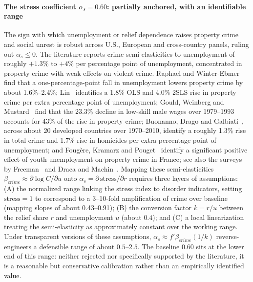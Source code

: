 \documentclass[review,12pt]{elsarticle}
\theoremstyle{plain}
\theoremstyle{definition}
\theoremstyle{remark}
\begin{document}
\paragraph{The stress coefficient $\alpha_s=0.60$: partially anchored, with an identifiable range} The sign with which unemployment or relief dependence raises property crime and social unrest is robust across U.S., European and cross-country panels, ruling out $\alpha_s\leq 0$. The literature reports crime semi-elasticities to unemployment of roughly $+1.3\%$ to $+4\%$ per percentage point of unemployment, concentrated in property crime with weak effects on violent crime. Raphael and Winter-Ebmer~\cite{RWE2001} find that a one-percentage-point fall in unemployment lowers property crime by about 1.6\%--2.4\%; Lin~\cite{Lin2008} identifies a 1.8\% OLS and 4.0\% 2SLS rise in property crime per extra percentage point of unemployment; Gould, Weinberg and Mustard~\cite{GWM2002} find that the 23.3\% decline in low-skill male wages over 1979--1993 accounts for 43\% of the rise in property crime; Buonanno, Drago and Galbiati~\cite{BDG2014}, across about 20 developed countries over 1970--2010, identify a roughly 1.3\% rise in total crime and 1.7\% rise in homicides per extra percentage point of unemployment; and Foug\`ere, Kramarz and Pouget~\cite{FKP2009} identify a significant positive effect of youth unemployment on property crime in France; see also the surveys by Freeman~\cite{Freeman1999} and Draca and Machin~\cite{DM2015}. Mapping these semi-elasticities $\beta_{crime}\approx\partial\log C/\partial u$ onto $\alpha_s=\partial\,\text{stress}/\partial r$ requires three layers of assumptions: (A) the normalized range linking the stress index to disorder indicators, setting $\text{stress}=1$ to correspond to a 3--10-fold amplification of crime over baseline (mapping slopes of about 0.43--0.91); (B) the conversion factor $k=r/u$ between the relief share $r$ and unemployment $u$ (about $0.4$); and (C) a local linearization treating the semi-elasticity as approximately constant over the working range. Under transparent versions of these assumptions, $\alpha_s\approx f'\beta_{crime}(1/k)$ reverse-engineers a defensible range of about $0.5$--$2.5$. The baseline $0.60$ sits at the lower end of this range: neither rejected nor specifically supported by the literature, it is a reasonable but conservative calibration rather than an empirically identified value.
\end{document}
